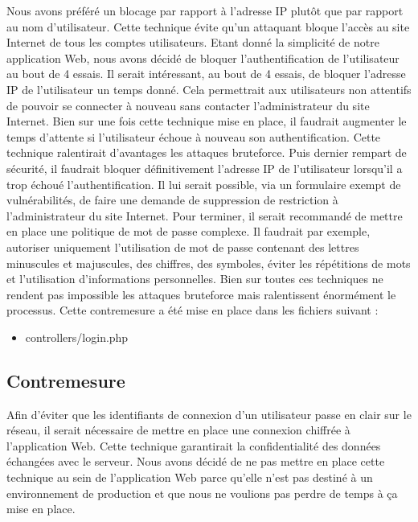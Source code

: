 \documentclass[12pt]{article}
\begin{document}
Nous avons préféré un blocage par rapport à l'adresse IP plutôt que par rapport au nom d'utilisateur. Cette technique évite qu'un attaquant bloque l'accès au site Internet de tous les comptes utilisateurs. Etant donné la simplicité de notre application Web, nous avons décidé de bloquer l'authentification de l'utilisateur au bout de 4 essais. Il serait intéressant, au bout de 4 essais, de bloquer l'adresse IP de l'utilisateur un temps donné. Cela permettrait aux utilisateurs non attentifs de pouvoir se connecter à nouveau sans contacter l'administrateur du site Internet. Bien sur une fois cette technique mise en place, il faudrait augmenter le temps d'attente si l'utilisateur échoue à nouveau son authentification. Cette technique ralentirait d'avantages les attaques bruteforce. Puis dernier rempart de sécurité, il faudrait bloquer définitivement l'adresse IP de l'utilisateur lorsqu'il a trop échoué l'authentification. Il lui serait possible, via un formulaire exempt de vulnérabilités, de faire une demande de suppression de restriction à l'administrateur du site Internet.
Pour terminer, il serait recommandé de mettre en place une politique de mot de passe complexe. Il faudrait par exemple,  autoriser uniquement l'utilisation de mot de passe contenant des lettres minuscules et majuscules, des chiffres, des symboles, éviter les répétitions de mots et l'utilisation d'informations personnelles. 
Bien sur toutes ces techniques ne rendent pas impossible les attaques bruteforce mais ralentissent énormément le processus.
Cette contremesure a été mise en place dans les fichiers suivant :

\begin{itemize}
\item controllers/login.php
\end{itemize}

\subsection{Contremesure}\label{c7}

Afin d'éviter que les identifiants de connexion d'un utilisateur passe en clair sur le réseau, il serait nécessaire de mettre en place une connexion chiffrée à l'application Web. Cette technique garantirait la confidentialité des données échangées avec le serveur.
Nous avons décidé de ne pas mettre en place cette technique au sein de l'application Web parce qu'elle n'est pas destiné à un environnement de production et que nous ne voulions pas perdre de temps à ça mise en place.
\end{document}
